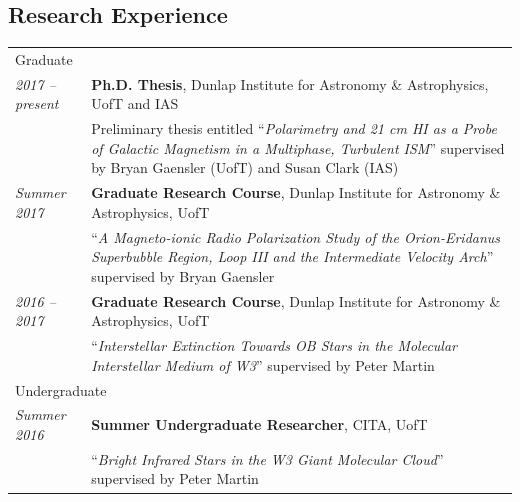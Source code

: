\documentclass[10pt]{res} %
\begin{document}
\begin{resume}
\section{\Large Research Experience}
\vspace{-5pt} %
\noindent\makebox[\linewidth]{\rule{\textwidth}{0.4pt}}
\vspace{-20pt} %

\begin{table}[h]
\begin{tabularx}{\textwidth}{ @{} p{6.5em} X @{} }
\multicolumn{2}{l}{ \rule{0pt}{3ex} \large \hspace{-12pt} Graduate \dotfill \rule[-1.2ex]{0pt}{0pt}} \\
\textit{2017 -- present} & \textbf{Ph.D. Thesis}, Dunlap Institute for Astronomy \& Astrophysics, UofT and IAS \\
                                    & Preliminary thesis entitled ``\textit{Polarimetry and 21 cm HI as a Probe of Galactic Magnetism in a Multiphase, Turbulent ISM}'' supervised by Bryan Gaensler (UofT) and Susan Clark (IAS) \\
\textit{Summer 2017} & \textbf{Graduate Research Course}, Dunlap Institute for Astronomy \& Astrophysics, UofT \\
                                   & ``\textit{A Magneto-ionic Radio Polarization Study of the Orion-Eridanus Superbubble Region, Loop III and the Intermediate Velocity Arch}'' supervised by Bryan Gaensler \\
\textit{2016 -- 2017} & \textbf{Graduate Research Course}, Dunlap Institute for Astronomy \& Astrophysics, UofT  \\
                                 & ``\textit{Interstellar Extinction Towards OB Stars in the Molecular Interstellar Medium of W3}'' supervised by Peter Martin \\
\multicolumn{2}{l}{ \rule{0pt}{6.5ex} \large \hspace{-12pt} Undergraduate \dotfill \rule[-1.2ex]{0pt}{0pt}} \\
\textit{Summer 2016} & \textbf{Summer Undergraduate Researcher}, CITA, UofT \\
                                  & ``\textit{Bright Infrared Stars in the W3 Giant Molecular Cloud}'' supervised by Peter Martin \\

\end{tabularx}
\end{table}
\end{resume}
\end{document}
